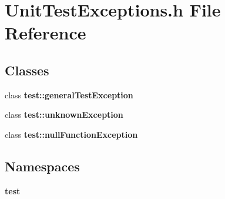 \section{Unit\+Test\+Exceptions.\+h File Reference}
\label{UnitTestExceptions_8h}
\subsection*{Classes}
\begin{DoxyCompactItemize}
\item 
class {\bf test\+::general\+Test\+Exception}
\item 
class {\bf test\+::unknown\+Exception}
\item 
class {\bf test\+::null\+Function\+Exception}
\end{DoxyCompactItemize}
\subsection*{Namespaces}
\begin{DoxyCompactItemize}
\item 
 {\bf test}
\end{DoxyCompactItemize}
